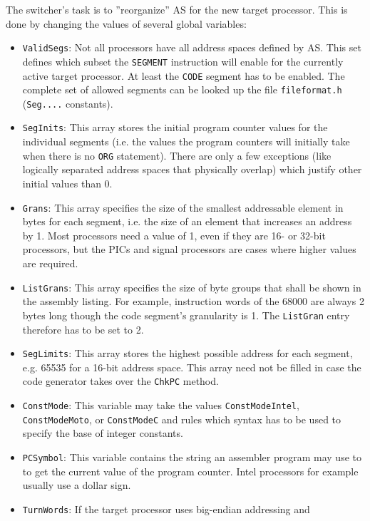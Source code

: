 \documentclass[12pt,twoside]{report}
\newcommand{\tty}[1]{{\tt #1}}
\newcommand{\asname}{{AS}}
\begin{document}
The switcher's task is to ''reorganize'' \asname{} for the new target
processor.  This is done by changing the values of several global
variables:
\begin{itemize}
\item{\tty{ValidSegs}: Not all processors have all address spaces defined
      by \asname{}.  This set defines which subset the \tty{SEGMENT} instruction
      will enable for the currently active target processor.  At least the
      \tty{CODE} segment has to be enabled.  The complete set of allowed
      segments can be looked up the file \tty{fileformat.h} (\tty{Seg....}
      constants).}
\item{\tty{SegInits}: This array stores the initial program counter values
      for the individual segments (i.e. the values the program counters
      will initially take when there is no \tty{ORG} statement).  There are
      only a few exceptions (like logically separated address spaces
      that physically overlap) which justify other initial values than
      0.}
\item{\tty{Grans}: This array specifies the size of the smallest addressable
      element in bytes for each segment, i.e. the size of an element
      that increases an address by 1.  Most processors need a value of
      1, even if they are 16- or 32-bit processors, but the PICs and
      signal processors are cases where higher values are required.}
\item{\tty{ListGrans}: This array specifies the size of byte groups that shall
      be shown in the assembly listing.  For example, instruction words
      of the 68000 are always 2 bytes long though the code segment's
      granularity is 1.  The \tty{ListGran} entry therefore has to be set to
      2.}
\item{\tty{SegLimits}: This array stores the highest possible address for
      each segment, e.g. 65535 for a 16-bit address space.  This array
      need not be filled in case the code generator takes over the
      {\tt ChkPC} method.}
\item{\tty{ConstMode}: This variable may take the values
      \tty{ConstModeIntel}, \tty{ConstModeMoto}, or \tty{ConstModeC}
      and rules which syntax has to be used to specify the base of
      integer constants.}
\item{\tty{PCSymbol}: This variable contains the string an assembler program
      may use to to get the current value of the program counter.
      Intel processors for example usually use a dollar sign.}
\item{\tty{TurnWords}: If the target processor uses big-endian addressing and
}
\end{itemize}
\end{document}

